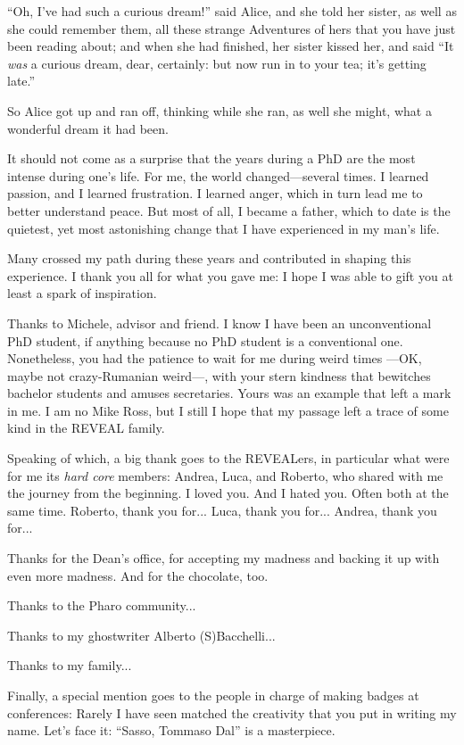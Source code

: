 
\begin{acknowledgements}

``Oh, I've had such a curious dream!'' said Alice, and she told her
sister, as well as she could remember them, all these strange Adventures
of hers that you have just been reading about; and when she had finished, her sister kissed her, and said ``It \emph{was} a curious dream, dear, certainly: but now run in to your tea; it's getting late.''

So Alice got up and ran off, thinking while she ran, as well she might,
what a wonderful dream it had been.

\vspace{10pt}

It should not come as a surprise that the years during a PhD are the most intense during one's life.
For me, the world changed---several times.
I learned passion, and I learned frustration.
I learned anger, which in turn lead me to better understand peace.
But most of all, I became a father, which to date is the quietest, yet most astonishing change that I have experienced in my man's life.

Many crossed my path during these years and contributed in shaping this experience.
I thank you all for what you gave me: I hope I was able to gift you at least a spark of inspiration.

Thanks to Michele, advisor and friend.
I know I have been an unconventional PhD student, if anything because no PhD student is a conventional one.
Nonetheless, you had the patience to wait for me during weird times ---OK, maybe not crazy-Rumanian weird---, with your stern kindness that bewitches bachelor students and amuses secretaries.
Yours was an example that left a mark in me.
I am no Mike Ross, but I still I hope that my passage left a trace of some kind in the REVEAL family.

Speaking of which, a big thank goes to the REVEALers, in particular what were for me its \emph{hard core} members: Andrea, Luca, and Roberto, who shared with me the journey from the beginning.
I loved you. And I hated you. Often both at the same time.
Roberto, thank you for...
Luca, thank you for...
Andrea, thank you for...

Thanks for the Dean's office, for accepting my madness and backing it up with even more madness.
And for the chocolate, too.

Thanks to the Pharo community...

Thanks to my ghostwriter Alberto (S)Bacchelli...

Thanks to my family...

Finally, a special mention goes to the people in charge of making badges at conferences: Rarely I have seen matched the creativity that you put in writing my name.
Let's face it: ``Sasso, Tommaso Dal'' is a masterpiece.



\end{acknowledgements}

